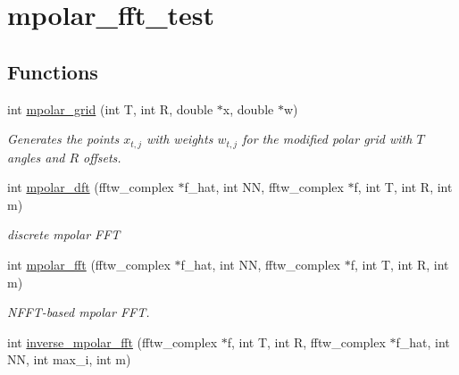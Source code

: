 \hypertarget{group__applications__polarFFT__mpolar}{
\section{mpolar\_\-fft\_\-test}
\label{group__applications__polarFFT__mpolar}
}
\subsection*{Functions}
\begin{CompactItemize}
\item 
int \hyperlink{group__applications__polarFFT__mpolar_ga1}{mpolar\_\-grid} (int T, int R, double $\ast$x, double $\ast$w)
\begin{CompactList}\small\item\em Generates the points $x_{t,j}$ with weights $w_{t,j}$ for the modified polar grid with $T$ angles and $R$ offsets. \item\end{CompactList}\item 
\hypertarget{group__applications__polarFFT__mpolar_ga2}{
int \hyperlink{group__applications__polarFFT__mpolar_ga2}{mpolar\_\-dft} (fftw\_\-complex $\ast$f\_\-hat, int NN, fftw\_\-complex $\ast$f, int T, int R, int m)}
\label{group__applications__polarFFT__mpolar_ga2}

\begin{CompactList}\small\item\em discrete mpolar FFT \item\end{CompactList}\item 
\hypertarget{group__applications__polarFFT__mpolar_ga3}{
int \hyperlink{group__applications__polarFFT__mpolar_ga3}{mpolar\_\-fft} (fftw\_\-complex $\ast$f\_\-hat, int NN, fftw\_\-complex $\ast$f, int T, int R, int m)}
\label{group__applications__polarFFT__mpolar_ga3}

\begin{CompactList}\small\item\em NFFT-based mpolar FFT. \item\end{CompactList}\item 
\hypertarget{group__applications__polarFFT__mpolar_ga4}{
int \hyperlink{group__applications__polarFFT__mpolar_ga4}{inverse\_\-mpolar\_\-fft} (fftw\_\-complex $\ast$f, int T, int R, fftw\_\-complex $\ast$f\_\-hat, int NN, int max\_\-i, int m)}
\label{group__applications__polarFFT__mpolar_ga4}


\end{CompactItemize}
